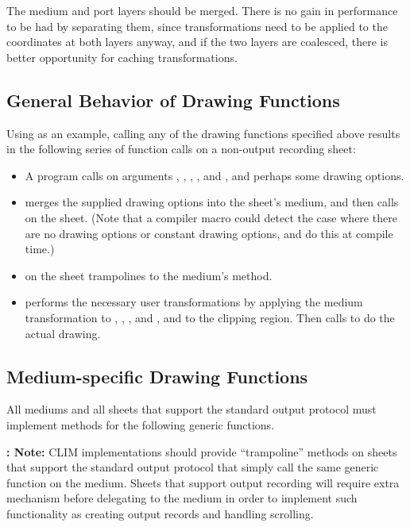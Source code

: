  {The medium and port layers should be merged.  There is no
gain in performance to be had by separating them, since transformations need to
be applied to the coordinates at both layers anyway, and if the two layers are
coalesced, there is better opportunity for caching transformations.}


\subsection {General Behavior of Drawing Functions}

Using  as an example, calling any of the drawing functions
specified above results in the following series of function calls on a
non-output recording sheet:

\begin{itemize}
\item A program calls  on arguments , ,
, , and , and perhaps some drawing options.

\item {} merges the supplied drawing options into the sheet's
medium, and then calls  on the sheet.  (Note that a
compiler macro could detect the case where there are no drawing options or
constant drawing options, and do this at compile time.)

\item {} on the sheet trampolines to the medium's
 method.

\item {} performs the necessary user transformations by
applying the medium transformation to , , , and
, and to the clipping region.  Then  calls
 to do the actual drawing.
\end{itemize}


\subsection {Medium-specific Drawing Functions}

All mediums and all sheets that support the standard output protocol must
implement methods for the following generic functions.

{\bf: Note:} CLIM implementations should provide ``trampoline'' methods on
sheets that support the standard output protocol that simply call the same
generic function on the medium.  Sheets that support output recording will
require extra mechanism before delegating to the medium in order to implement
such functionality as creating output records and handling scrolling.

